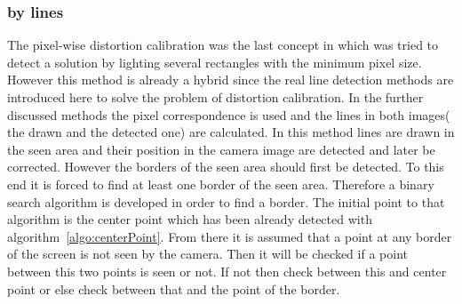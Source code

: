 \documentclass[journal,final,a4paper,twoside]{PS}
\begin{document}
\subsubsection{by lines}
The pixel-wise distortion calibration was the last concept in which was tried to detect a solution by lighting several rectangles with the minimum pixel size. However this method is already a hybrid since the real line detection methods are introduced here to solve the problem of distortion calibration. In the further discussed methods the pixel correspondence is used and the lines in both images( the drawn and the detected one) are calculated. In this method lines are drawn in the seen area and their position in the camera image are detected and later be corrected. However the borders of the seen area should first be detected. To this end it is forced to find at least one border of the seen area. Therefore a binary search algorithm is developed in order to find a border. The initial point to that algorithm is the center point which has been already detected with algorithm~\ref{algo:centerPoint}. From there it is assumed that a point at any border of the screen is not seen by the camera. Then it will be checked if a point between this two points is seen or not. If not then check between this and center point or else check between that and the point of the border. %


\end{document}
